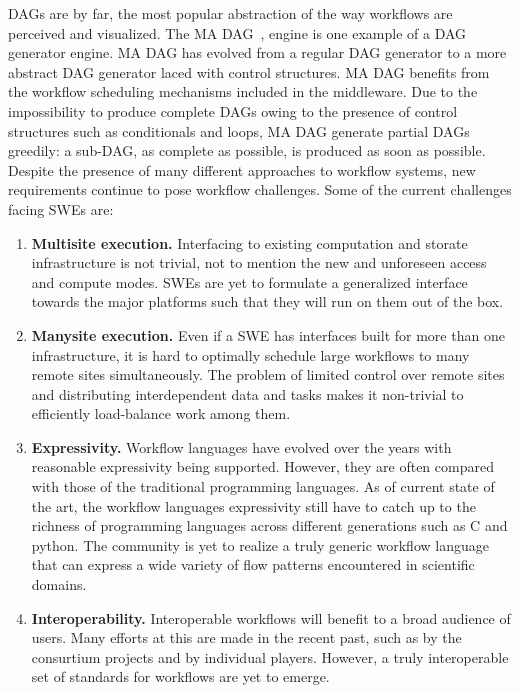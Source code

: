 DAGs are by far, the most popular abstraction of the way workflows are
perceived and visualized. The MA DAG~\cite{caron-desprez:2005}, engine is one
example of a DAG generator engine. MA DAG has evolved from a regular DAG
generator to a more abstract DAG generator laced with control structures. MA
DAG benefits from the workflow scheduling mechanisms included in the
middleware. Due to the impossibility to produce complete DAGs owing to the
presence of control structures such as conditionals and loops, MA DAG generate
partial DAGs greedily: a sub-DAG, as complete as possible, is produced as soon
as possible. Despite the presence of many different approaches to workflow
systems, new requirements continue to pose workflow challenges. Some of the
current challenges facing SWEs are:

\begin{enumerate}
\item \textbf{Multisite execution.} Interfacing to existing computation and
storate infrastructure is not trivial, not to mention the new and
unforeseen access and compute modes. SWEs are yet to formulate a
generalized interface towards the major platforms such that they will
run on them out of the box.

\item \textbf{Manysite execution.} Even if a SWE has interfaces built for
more than one infrastructure, it is hard to optimally schedule large
workflows to many remote sites simultaneously. The problem of limited
control over remote sites and distributing interdependent data and
tasks makes it non-trivial to efficiently load-balance work among them.

\item \textbf{Expressivity.} Workflow languages have evolved over the years
with reasonable expressivity being supported. However, they are often
compared with those of the traditional programming languages. As of
current state of the art, the workflow languages expressivity still
have to catch up to the richness of programming languages across
different generations such as C and python.  The community is yet to
realize a truly generic workflow language that can express a wide
variety of flow patterns encountered in scientific domains.

\item \textbf{Interoperability.} Interoperable workflows will benefit to a
broad audience of users. Many efforts at this are made in the recent
past, such as by the consurtium projects and by individual players.
However, a truly interoperable set of standards for workflows are yet
to emerge.
\end{enumerate}
